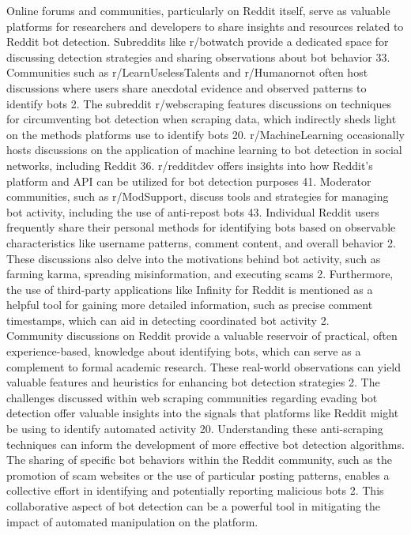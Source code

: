 \documentclass[
  12pt,
  letterpaper,
  DIV=11,
  numbers=noendperiod]{scrartcl}
\begin{document}
Online forums and communities, particularly on Reddit itself, serve as
valuable platforms for researchers and developers to share insights and
resources related to Reddit bot detection. Subreddits like r/botwatch
provide a dedicated space for discussing detection strategies and
sharing observations about bot behavior 33. Communities such as
r/LearnUselessTalents and r/Humanornot often host discussions where
users share anecdotal evidence and observed patterns to identify bots 2.
The subreddit r/webscraping features discussions on techniques for
circumventing bot detection when scraping data, which indirectly sheds
light on the methods platforms use to identify bots 20.
r/MachineLearning occasionally hosts discussions on the application of
machine learning to bot detection in social networks, including Reddit
36. r/redditdev offers insights into how Reddit's platform and API can
be utilized for bot detection purposes 41. Moderator communities, such
as r/ModSupport, discuss tools and strategies for managing bot activity,
including the use of anti-repost bots 43. Individual Reddit users
frequently share their personal methods for identifying bots based on
observable characteristics like username patterns, comment content, and
overall behavior 2. These discussions also delve into the motivations
behind bot activity, such as farming karma, spreading misinformation,
and executing scams 2. Furthermore, the use of third-party applications
like Infinity for Reddit is mentioned as a helpful tool for gaining more
detailed information, such as precise comment timestamps, which can aid
in detecting coordinated bot activity 2.\\
Community discussions on Reddit provide a valuable reservoir of
practical, often experience-based, knowledge about identifying bots,
which can serve as a complement to formal academic research. These
real-world observations can yield valuable features and heuristics for
enhancing bot detection strategies 2. The challenges discussed within
web scraping communities regarding evading bot detection offer valuable
insights into the signals that platforms like Reddit might be using to
identify automated activity 20. Understanding these anti-scraping
techniques can inform the development of more effective bot detection
algorithms. The sharing of specific bot behaviors within the Reddit
community, such as the promotion of scam websites or the use of
particular posting patterns, enables a collective effort in identifying
and potentially reporting malicious bots 2. This collaborative aspect of
bot detection can be a powerful tool in mitigating the impact of
automated manipulation on the platform.
\end{document}
